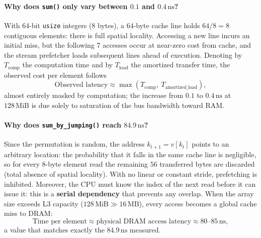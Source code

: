 \paragraph{Why does \texttt{sum()} only vary between $0.1$ and $0.4\,\text{ns}$?} With 64-bit \texttt{usize} integers ($8$ bytes), a $64$-byte cache line holds $64/8 = 8$ contiguous elements: there is full spatial locality. Accessing a new line incurs an initial miss, but the following $7$ accesses occur at near-zero cost from cache, and the stream prefetcher loads subsequent lines ahead of execution. Denoting by $T_{\text{comp}}$ the computation time and by $T_{\text{load}}$ the amortized transfer time, the observed cost per element follows
\[
\text{Observed latency} \approx \max\!\left(T_{\text{comp}},\ T_{\text{amortized\_load}}\right),
\]
almost entirely masked by computation; the increase from $0.1$ to $0.4\,\text{ns}$ at $128\,\text{MiB}$ is due solely to saturation of the bus bandwidth toward RAM.

\paragraph{Why does \texttt{sum\_by\_jumping()} reach $84.9\,\text{ns}$?} Since the permutation is random, the address $k_{t+1} = v[k_t]$ points to an arbitrary location: the probability that it falls in the same cache line is negligible, so for every $8$-byte element read the remaining $56$ transferred bytes are discarded (total absence of spatial locality). With no linear or constant stride, prefetching is inhibited. Moreover, the CPU must know the index of the next read before it can issue it: this is a \textbf{serial dependency} that prevents any overlap. When the array size exceeds L3 capacity ($128\,\text{MiB} \gg 16\,\text{MB}$), every access becomes a global cache miss to DRAM:
\[
\text{Time per element} \approx \text{physical DRAM access latency} \approx 80\text{--}85\,\text{ns},
\]
a value that matches exactly the $84.9\,\text{ns}$ measured.


